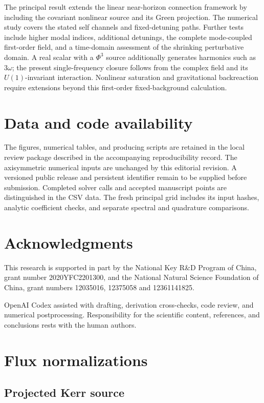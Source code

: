 \documentclass[aps,prd,twocolumn,10pt,nofootinbib,superscriptaddress,floatfix]{revtex4-2}
\begin{document}
The principal result extends the linear near-horizon connection framework
\cite{BredbergKerrCFT2010} by including the covariant nonlinear source and
its Green projection.  The numerical study covers the stated self channels
and fixed-detuning paths.  Further tests include higher modal indices,
additional detunings, the complete mode-coupled first-order field, and a
time-domain assessment of the shrinking perturbative domain.  A real
scalar with a $\Phi^3$ source additionally generates harmonics such as
$3\omega$; the present single-frequency closure follows from the complex
field and its $U(1)$-invariant interaction.  Nonlinear saturation and
gravitational backreaction require extensions beyond this first-order
fixed-background calculation.

\section*{Data and code availability}

The figures, numerical tables, and producing scripts are retained in the
local review package described in the accompanying reproducibility record.
The axisymmetric numerical inputs are unchanged by this editorial revision.
A versioned public release and persistent identifier remain to be supplied
before submission.
Completed solver calls and accepted manuscript points are distinguished in
the CSV data.  The fresh principal grid includes its input hashes, analytic
coefficient checks, and separate spectral and quadrature comparisons.

\section*{Acknowledgments}

This research is supported in part by the National Key R\&D Program of
China, grant number 2020YFC2201300, and the National Natural Science
Foundation of China, grant numbers 12035016, 12375058 and 12361141825.

OpenAI Codex assisted with drafting, derivation cross-checks, code review,
and numerical postprocessing.  Responsibility for the scientific content,
references, and conclusions rests with the human authors.
\appendix

\section{Flux normalizations}
\label{app:flux}

\subsection{Projected Kerr source}
\end{document}
